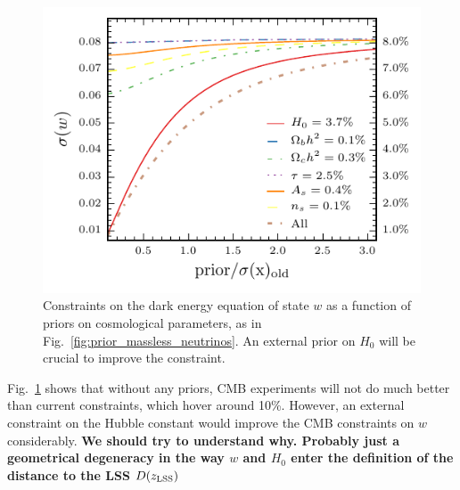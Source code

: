 \documentclass[aps,prd,reprint,superscriptaddress]{revtex4-1}
\newcommand{\reffig}[1]{Fig.~\ref{fig:#1}}
\begin{document}
\begin{figure}[htbp]
\begin{center}
\includegraphics{prior_w_snow_mass_lmin=4_lmax=4499.pdf}
\caption{Constraints on the dark energy equation of state $w$ as a function of priors on cosmological parameters, as in \reffig{prior_massless_neutrinos}. An external prior on $H_{0}$ will be crucial to improve the constraint.} 
\label{fig:prior_w}
\end{center}
\end{figure}

\reffig{prior_w} shows that without any priors, CMB experiments will not do much better than current constraints, which hover around 10\%. However, an external constraint on the Hubble constant would improve the CMB constraints on $w$ considerably. {\bf We should try to understand why. Probably just a geometrical degeneracy in the way $w$ and $H_{0}$ enter the definition of the distance to the LSS $D(z_{\rm LSS})$}
\end{document}
